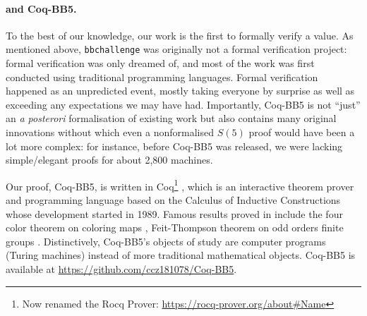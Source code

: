 \documentclass[a4paper,british]{article}
\theoremstyle{definition} %
\numberwithin{equation}{section}
\theoremstyle{definition} %
\newcommand{\ts}[1]{{\color{red}#1}}
\newcommand{\CoqBB}{Coq-BB5\xspace}
\begin{document}


\paragraph{\Coq and \CoqBB.} To the best of our knowledge, our work is the first to formally verify a \BBfull value. As mentioned above, \texttt{bbchallenge} was originally not a formal verification project: formal verification was only dreamed of, and most of the work was first conducted using traditional programming languages. Formal verification happened as an unpredicted event, mostly taking everyone by surprise as well as exceeding any expectations we may have had. Importantly, \CoqBB is not ``just'' an \textit{a posterori} formalisation of existing work but also contains many original innovations without which even a nonformalised $S(5)$ proof would have been a lot more complex: for instance, before \CoqBB was released, we were lacking simple/elegant proofs for about 2,800 machines.

Our proof, \CoqBB, is written in Coq\footnote{Now renamed the Rocq Prover: \url{https://rocq-prover.org/about\#Name}} \cite{the_coq_development_team_2024_14542673}, which is an interactive theorem prover and programming language based on the Calculus of Inductive Constructions \cite{CoC} whose development started in 1989. Famous results proved in \Coq include the four color theorem on coloring maps \cite{gonthier2008formal, gonthier2023computer}, Feit-Thompson theorem on odd orders finite groups \cite{gonthier2013machine}. Distinctively, \CoqBB's objects of study are computer programs (Turing machines) instead of more traditional mathematical objects. \CoqBB is available at \url{https://github.com/ccz181078/Coq-BB5}.
\end{document}

